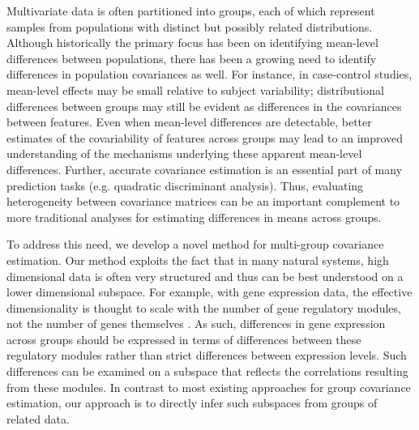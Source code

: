 \documentclass{statsoc}
\begin{document}
Multivariate data is often partitioned into
groups, each of which represent samples from populations with
distinct but possibly related distributions.  Although historically the
primary focus has been on identifying mean-level differences between
populations, there has been a growing need to identify differences in
population covariances as well.  For instance, in case-control studies, mean-level effects may be small relative to subject
variability; distributional differences between groups may still be
evident as differences in the covariances between features.  Even when
mean-level differences are detectable, better estimates of the
covariability of features across groups may lead to an improved
understanding of the mechanisms underlying these apparent mean-level
differences.  Further, accurate covariance estimation is an essential
part of many prediction tasks (e.g. quadratic discriminant analysis).
Thus, evaluating heterogeneity between covariance
matrices can be an important complement to more traditional analyses
for estimating differences in means across
groups.

To address this need, we develop a novel method for
multi-group covariance estimation.  Our method exploits the fact that
in many natural systems, high dimensional data is often very
structured and thus can be best understood on a lower dimensional
subspace. For example, with gene expression data, the effective
dimensionality is thought to scale with the number of gene regulatory
modules, not the number of genes themselves \citep{Heimberg2016}.  As
such, differences in gene expression across groups should be expressed
in terms of differences between these regulatory modules rather than
strict differences between expression levels.  Such differences can be
examined on a subspace that reflects the correlations resulting from
these modules.  In contrast to most existing approaches for group
covariance estimation, our approach is to directly infer such
subspaces from groups of related data.

\end{document}
